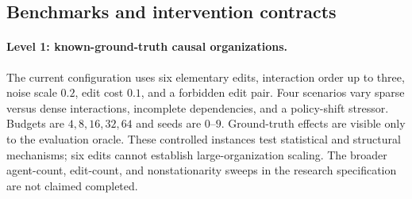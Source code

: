 \documentclass[runningheads]{llncs}
\begin{document}
\subsection{Benchmarks and intervention contracts}
\paragraph{Level 1: known-ground-truth causal organizations.}
The current configuration uses six elementary edits, interaction order up to three, noise scale $0.2$, edit cost $0.1$, and a forbidden edit pair. Four scenarios vary sparse versus dense interactions, incomplete dependencies, and a policy-shift stressor. Budgets are $4,8,16,32,64$ and seeds are $0$--$9$. Ground-truth effects are visible only to the evaluation oracle. These controlled instances test statistical and structural mechanisms; six edits cannot establish large-organization scaling. The broader agent-count, edit-count, and nonstationarity sweeps in the research specification are not claimed completed.
\end{document}
